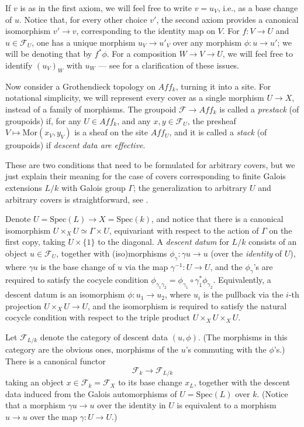 If $v$ is as in the first axiom, we will feel free to write $v=u_V$, i.e., as a base change of $u$. Notice that, for every other choice $v'$, the second axiom provides a canonical isomorphism $v'\to v$, corresponding to the identity map on $V$. For $f: V\to U$ and $u\in \mathcal F_U$, one has a unique morphism $u_V\to u'_V$ over any morphism $\phi: u\to u'$; we will be denoting that by $f^*\phi$. For a composition $W\to V\to U$, we will feel free to identify $(u_V)_W$ with $u_W$ --- see \cite[Tag 02XN]{stacks-project} for a clarification of these issues. 

Now consider a Grothendieck topology on $Aff_k$, turning it into a site. For notational simplicity, we will represent every cover as a single morphism $U\to X$, instead of a family of morphisms. The groupoid $\mathcal F \to Aff_k$ is called a \emph{prestack} (of groupoids) if, for any $U\in Aff_k$, and any $x,y \in \mathcal F_U$, the presheaf $V\mapsto \text{Mor}(x_V,y_V)$ is a sheaf on the site $Aff_U$, and it is called a \emph{stack} (of groupoids) if \emph{descent data are effective}. 

These are two conditions that need to be formulated for arbitrary covers, but we just explain their meaning for the case of covers corresponding to finite Galois extensions $L/k$ with Galois group $\Gamma$; the generalization to arbitrary $U$ and arbitrary covers is straightforward, see \cite[Tag 0268]{stacks-project}. 

Denote $U=\text{Spec}(L) \to X=\text{Spec}(k)$, and notice that there is a canonical isomorphism $U\times_X U \simeq \Gamma\times  U$, equivariant with respect to the action of $\Gamma$ on the first copy, taking $U\times \{1\}$ to the diagonal. A \emph{descent datum} for $L/k$ consists of an object $u\in \mathcal F_U$, together with (iso)morphisms $\phi_\gamma: \gamma u \to u$ (over the \emph{identity} of $U$), where $\gamma u$ is the base change of $u$ via the map $\gamma^{-1}: U\to U$, and the $\phi_\gamma$'s are required to satisfy the cocycle condition $\phi_{\gamma_1 \gamma_2} = \phi_{\gamma_1} \circ \gamma_1^* \phi_{\gamma_2}$. Equivalently, a descent datum is an isomorphism $\phi: u_1 \to u_2$, where $u_i$ is the pullback via the $i$-th projection $U\times_X U\to U$, and the isomorphism is required to satisfy the natural cocycle condition with respect to the triple product $U\times_X U\times_X U$.

Let $\mathcal F_{L/k}$ denote the category of descent data $(u, \phi)$. (The morphisms in this category are the obvious ones, morphisms of the $u$'s commuting with the $\phi$'s.) There is a canonical functor 
\begin{equation}
\label{equation-descent} 
\mathcal F_k \to \mathcal F_{L/k} 
\end{equation}
taking an object $x\in \mathcal F_k = \mathcal F_X$ to its base change $x_L$, together with the descent data induced from the Galois automorphisms of $U=\text{Spec}(L)$ over $k$. (Notice that a morphism $\gamma u \to u$ over the identity in $U$ is equivalent to a morphism $u\to u$ over the map $\gamma: U\to U$.)

